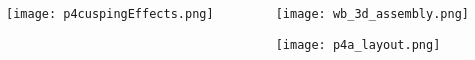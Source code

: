 \begin{frame}
    
\begin{columns}
    \begin{column}{0.8\textwidth}
\begin{center}
    \texttt{[image: p4cuspingEffects.png]}
\end{center}
\vfill
\end{column}
\begin{column}{0.2\textwidth}
    \begin{center}
    \texttt{[image: wb\_3d\_assembly.png]}
    
    \texttt{[image: p4a\_layout.png]}
    \end{center}
\vfill
\end{column}
\end{columns}
    
\end{frame}


